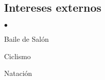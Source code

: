 \documentclass[margin,line]{res}
\newenvironment{list1}{
  \begin{list}{\ding{113}}{%
      \setlength{\itemsep}{0in}
      \setlength{\parsep}{0in} \setlength{\parskip}{0in}
      \setlength{\topsep}{0in} \setlength{\partopsep}{0in} 
      \setlength{\leftmargin}{0.17in}}}{\end{list}}
\newenvironment{list2}{
  \begin{list}{$\bullet$}{%
      \setlength{\itemsep}{0in}
      \setlength{\parsep}{0in} \setlength{\parskip}{0in}
      \setlength{\topsep}{0in} \setlength{\partopsep}{0in} 
      \setlength{\leftmargin}{0.2in}}}{\end{list}}
\begin{document}
\begin{resume}



\section{\sc Intereses externos}
 \begin{list2}
  \item Baile de Salón
  \item Ciclismo
  \item Natación
 \end{list2}

\end{resume}
\end{document}
